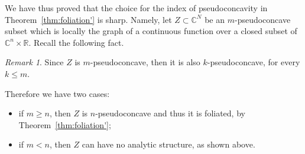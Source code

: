 \documentclass[reqno,oneside]{amsart}
\newcommand{\numberset}{\mathbb}
\newcommand{\R}{\numberset{R}}
\newcommand{\C}{\numberset{C}}
\theoremstyle{definition}
\theoremstyle{plain}
\theoremstyle{remark}
\newtheorem{remark}[definition]{Remark}
\begin{document}
We have thus proved that the choice for the index of pseudoconcavity in Theorem~\ref{thm:foliation'} is sharp. Namely, let $Z\subset\C^N$ be an $m$-pseudoconcave subset which is locally the graph of a continuous function over a closed subset of $\C^n\times\R$. Recall the following fact.
\begin{remark}
	Since $Z$ is $m$-pseudoconcave, then it is also $k$-pseudoconcave, for every $k\leq m$.
\end{remark}
Therefore we have two cases:
\begin{itemize}
	\item if $m\geq n$, then $Z$ is $n$-pseudoconcave and thus it is foliated, by Theorem~\ref{thm:foliation'};
	\item if $m<n$, then $Z$ can have no analytic structure, as shown above.
\end{itemize}



\printbibliography
\end{document}
